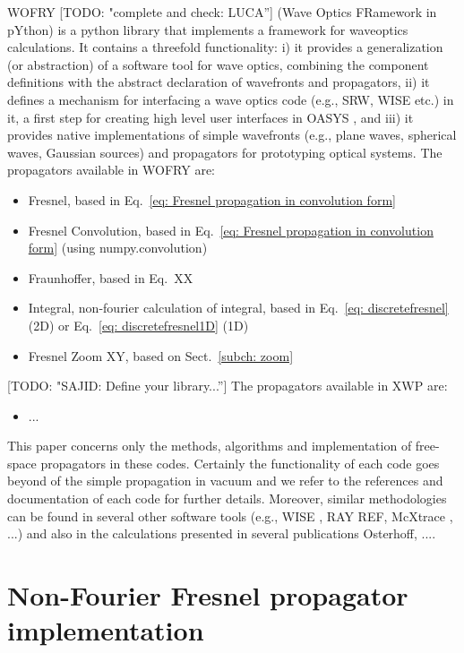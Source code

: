 \documentclass{iucr}              %
\newcommand{\todo}[1]{{\color{red}[TODO: "#1'']}}
\newcommand{\inred}[1]{{\color{red}#1}}
\begin{document}
WOFRY \todo{complete and check: LUCA} \cite{Wofrygit} (Wave Optics FRamework in pYthon) is a python library that implements a framework for waveoptics calculations. It contains a threefold functionality: i) it provides a generalization (or abstraction) of a software tool for wave optics, combining the component definitions with the abstract declaration of wavefronts and propagators, ii) it defines a mechanism for interfacing a wave optics code (e.g., SRW, WISE etc.) in it, a first step for creating high level user interfaces in OASYS \cite{oasys}, and iii) it provides native implementations of simple wavefronts (e.g., plane waves, spherical waves, Gaussian sources) and propagators for prototyping optical systems.
The propagators available in WOFRY are: 
\begin{itemize}
    \item Fresnel, based in Eq.~\ref{eq: Fresnel propagation in convolution form}
    \item Fresnel Convolution, based in Eq.~\ref{eq: Fresnel propagation in convolution form} \inred{(using numpy.convolution)}
    \item Fraunhoffer, based in Eq.~XX
    \item Integral, non-fourier calculation of integral, based in Eq.~\ref{eq: discretefresnel} (2D) or Eq.~\ref{eq: discretefresnel1D} (1D)
    \item Fresnel Zoom XY, based on Sect.~\ref{subch: zoom}
\end{itemize}

\todo{SAJID: Define your library...}
The propagators available in XWP are: 
\begin{itemize}
    \item \inred{...}
\end{itemize}

This paper concerns only the methods, algorithms and implementation of free-space propagators in these codes. Certainly the functionality of each code goes beyond of the simple propagation in vacuum and we refer to the references and documentation of each code for further details. Moreover, similar methodologies can be found in several other software tools (e.g., WISE \cite{wise}, RAY \inred{REF}, McXtrace \cite{mcxtrace}, ...) and also in the calculations presented in several publications \inred{Osterhoff, ...}.


\section{Non-Fourier Fresnel propagator implementation}
\label{ch: non-fourier-propagators}
\end{document}
